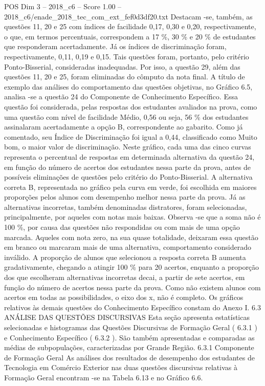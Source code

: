 \begin{textsample}{POS Dim 3 – 2018\_c6 – Score 1.00 – 2018\_c6/enade\_2018\_tec\_com\_ext\_fef0d3df20.txt}
Destacam -se, também, as questões 11, 20 e 25 com índices de facilidade 0,17, 0,30 e 0,20, respectivamente, o que, em termos percentuais, correspondem a 17 \%, 30 \% e 20 \% de estudantes que responderam acertadamente.
Já os índices de discriminação foram, respectivamente, 0,11, 0,19 e 0,15.
Tais questões foram, portanto, pelo critério Ponto-Bisserial, consideradas inadequadas.
Por isso, a questão 29, além das questões 11, 20 e 25, foram eliminadas do cômputo da nota final.
A título de exemplo das análises do comportamento das questões objetivas, no Gráfico 6.5, analisa -se a questão 24 do Componente de Conhecimento Específico.
Essa questão foi considerada, pelas respostas dos estudantes avaliados na prova, como uma questão com nível de facilidade Médio, 0,56 ou seja, 56 \% dos estudantes assinalaram acertadamente a opção B, correspondente ao gabarito.
Como já comentado, seu Índice de Discriminação foi igual a 0,44, classificado como Muito bom, o maior valor de discriminação.
Neste gráfico, cada uma das cinco curvas representa o percentual de respostas em determinada alternativa da questão 24, em função do número de acertos dos estudantes nessa parte da prova, antes de possíveis eliminações de questões pelo critério do Ponto-Bisserial.
A alternativa correta B, representada no gráfico pela curva em verde, foi escolhida em maiores proporções pelos alunos com desempenho melhor nessa parte da prova.
Já as alternativas incorretas, também denominadas distratores, foram selecionadas, principalmente, por aqueles com notas mais baixas.
Observa -se que a soma não é 100 \%, por causa das questões não respondidas ou com mais de uma opção marcada.
Aqueles com nota zero, na sua quase totalidade, deixaram essa questão em branco ou marcaram mais de uma alternativa, comportamento considerado inválido.
A proporção de alunos que selecionou a resposta correta B aumenta gradativamente, chegando a atingir 100 \% para 20 acertos, enquanto a proporção dos que escolheram alternativas incorretas decai, a partir de sete acertos, em função do número de acertos nessa parte da prova.
Como não existem alunos com acertos em todas as possibilidades, o eixo dos x, não é completo.
Os gráficos relativos às demais questões do Conhecimento Específico constam do Anexo I. 6.3 ANÁLISE DAS QUESTÕES DISCURSIVAS Esta seção apresenta estatísticas selecionadas e histogramas das Questões Discursivas de Formação Geral ( 6.3.1 ) e Conhecimento Específico ( 6.3.2 ).
São também apresentadas e comparadas as médias de subpopulações, caracterizadas por Grande Região. 6.3.1 Componente de Formação Geral As análises dos resultados de desempenho dos estudantes de Tecnologia em Comércio Exterior nas duas questões discursivas relativas à Formação Geral encontram -se na Tabela 6.13 e no Gráfico 6.6.

\end{textsample}
